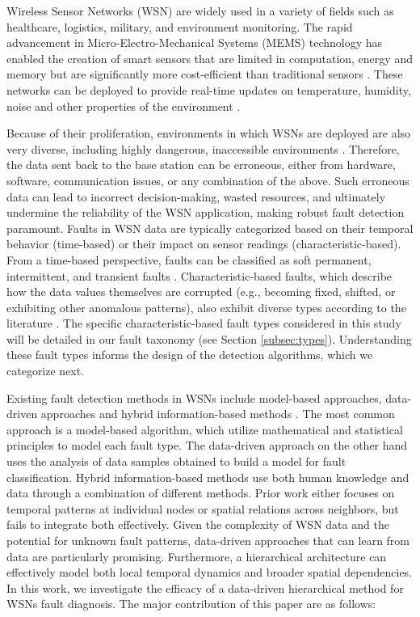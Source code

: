 Wireless Sensor Networks (WSN) are widely used in a variety of fields such as healthcare, logistics, military, and environment monitoring. The rapid advancement in Micro-Electro-Mechanical Systems (MEMS) technology has enabled the creation of smart sensors that are limited in computation, energy and memory but are significantly more cost-efficient than traditional sensors \cite{Yick2008, Chai2020, Hussain2021}. These networks can be deployed to provide real-time updates on temperature, humidity, noise and other properties of the environment \cite{Yick2008, Chai2020, Ullo2020}.

Because of their proliferation, environments in which WSNs are deployed are also very diverse, including highly dangerous, inaccessible environments \cite{Prasad2023}. Therefore, the data sent back to the base station can be erroneous, either from hardware, software, communication issues, or any combination of the above. Such erroneous data can lead to incorrect decision-making, wasted resources, and ultimately undermine the reliability of the WSN application, making robust fault detection paramount. Faults in WSN data are typically categorized based on their temporal behavior (time-based) or their impact on sensor readings (characteristic-based). From a time-based perspective, faults can be classified as soft permanent, intermittent, and transient faults \cite{Prasad2023}. Characteristic-based faults, which describe how the data values themselves are corrupted (e.g., becoming fixed, shifted, or exhibiting other anomalous patterns), also exhibit diverse types according to the literature \cite{Shi2024, Saeed2021, Ni2009, Hasan2024}. The specific characteristic-based fault types considered in this study will be detailed in our fault taxonomy (see Section \ref{subsec:types}). Understanding these fault types informs the design of the detection algorithms, which we categorize next.

Existing fault detection methods in WSNs include model-based approaches, data-driven approaches and hybrid information-based methods \cite{Shi2024}. The most common approach is a model-based algorithm, which utilize mathematical and statistical principles to model each fault type. The data-driven approach on the other hand uses the analysis of data samples obtained to build a model for fault classification. Hybrid information-based methods use both human knowledge and data through a combination of different methods. Prior work either focuses on temporal patterns at individual nodes or spatial relations across neighbors, but fails to integrate both effectively. Given the complexity of WSN data and the potential for unknown fault patterns, data-driven approaches that can learn from data are particularly promising. Furthermore, a hierarchical architecture can effectively model both local temporal dynamics and broader spatial dependencies. In this work, we investigate the efficacy of a data-driven hierarchical method for WSNs fault diagnosis. The major contribution of this paper are as follows:

